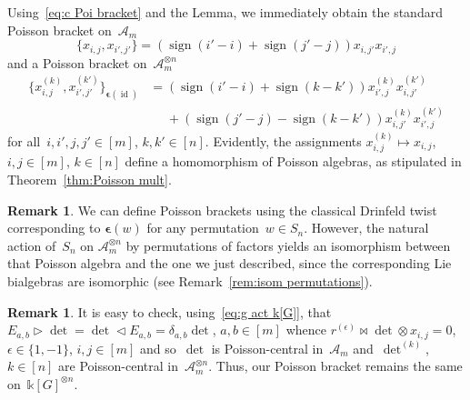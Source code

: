 \documentclass[12pt, reqno]{amsart}
\theoremstyle{definition}
\newtheorem{remark}[theorem]{Remark}
\numberwithin{equation}{section}
\newcommand{\tensor}{\otimes}
\newcommand{\kk}{\mathbb{k}}\newcommand{\lie}[1]{{\mathfrak{#1}}}
\DeclareMathOperator{\id}{id}
\DeclareMathOperator{\sign}{sign}
\newcommand{\sgna}[1]{\boldsymbol{\epsilon}(#1)}
\begin{document}
Using~\eqref{eq:c Poi bracket} and the Lemma, we immediately obtain the standard Poisson bracket 
on~$\mathcal A_m$
\begin{equation}
\{ x_{i,j},x_{i',j'}\}=(\sign(i'-i)+\sign(j'-j))x_{i,j'}x_{i',j}\label{eq:Am Pois bracket}
\end{equation}
and a Poisson bracket on~$\mathcal A_m^{\tensor n}$
\begin{align}
\{ x_{i,j}^{(k)},x_{i',j'}^{(k')}\}_{\sgna{\id}}
&=(\sign(i'-i)+\sign(k-k'))x_{i',j}^{(k)}x_{i,j'}^{(k')}\nonumber\\
&\phantom{=}+(\sign(j'-j)-\sign(k-k'))x_{i,j'}^{(k)}x_{i',j}^{(k')}\label{eq:Am,n Pois bracket}
\end{align}
for all~$i,i',j,j'\in[m]$, $k,k'\in[n]$.
Evidently, the assignments $x_{i,j}^{(k)}\mapsto 
x_{i,j}$, $i,j\in[m]$, $k\in[n]$ define a homomorphism
of Poisson algebras, as stipulated in Theorem~\ref{thm:Poisson mult}.
\begin{remark}\label{rem:Pois perms}
We can define Poisson brackets using the classical
Drinfeld twist corresponding to $\sgna{w}$ for any permutation~$w\in S_n$. However, the natural action of~$S_n$
on $\mathcal A_m^{\tensor n}$ by permutations of factors
yields an isomorphism between that Poisson algebra
and the one we just described, since the corresponding
Lie bialgebras are isomorphic (see Remark~\ref{rem:isom permutations}).
\end{remark}
\begin{remark}
It is easy to check, using~\eqref{eq:g act k[G]}, that
$E_{a,b}\triangleright\det=\det\triangleleft E_{a,b}=
\delta_{a,b}\det$, $a,b\in[m]$ whence $r^{(\epsilon)}\bowtie 
\det\tensor x_{i,j}=0$, $\epsilon\in\{1,-1\}$, $i,j\in[m]$ and so~$\det$ is Poisson-central
in~$\mathcal A_m$ and~$\det^{(k)}$, $k\in[n]$ are Poisson-central
in~$\mathcal A_{m}^{\tensor n}$. Thus, our Poisson bracket remains the same on~$\kk[G]^{\tensor n}$.
\end{remark}
\end{document}
